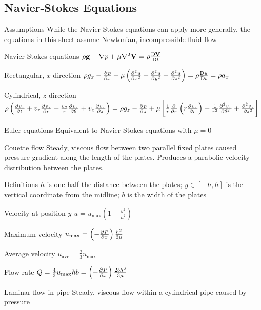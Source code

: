 \documentclass{article}
\begin{document}
\subsection{Navier-Stokes Equations}
\begin{description*}
\item[Assumptions] While the Navier-Stokes equations can apply more generally, the equations in this
  sheet assume Newtonian, incompressible fluid flow
\item[Navier-Stokes equations]
  \(\rho\vec{g} - \vec\nabla p + \mu\vec\nabla^2\vec{V} = \rho\frac{\Dif\vec V}{\Dif t}\)
  \begin{description*}
  \item[Rectangular, $x$ direction]
    \(\rho g_x - \pd{p}{x} + \mu\left(\pd[2]{u}{x}+\pd[2]{u}{y}+\pd[2]{u}{z}\right)
    = \rho\frac{\Dif u}{\Dif t} = \rho a_x\)
  \item[Cylindrical, $z$ direction]
    \(\rho\left(\pd{v_z}{t}+v_r\pd{v_z}{r}+\frac{v_\theta}{r}\pd{v_z}{\theta}+v_z\pd{v_z}{z}\right)
    = \rho g_z - \pd{p}{z}
    + \mu\left[\frac{1}{r}\pd{}{r}\left(r\pd{v_z}{r}\right)
      + \frac{1}{r^2}\pd[2]{v_z}{\theta}
      + \pd[2]{v_z}{z}\right]\)
  \end{description*}
\item[Euler equations] Equivalent to Navier-Stokes equations with $\mu=0$
\item[Couette flow] Steady, viscous flow between two parallel fixed plates caused pressure gradient
  along the length of the plates. Produces a parabolic velocity distribution between the plates.
  \begin{description*}
  \item[Definitions] $h$ is one half the distance between the plates;
    $y\in[-h,h]$ is the vertical coordinate from the midline;
    $b$ is the width of the plates
  \item[Velocity at position $y$]
    \(u = u_\mathrm{max}\left(1-\frac{y^2}{h^2}\right)\)
  \item[Maximum velocity]
    \(u_\mathrm{max} = \left(-\pd{P}{x}\right)\frac{h^2}{2\mu}\)
  \item[Average velocity]
    \(u_\mathrm{ave} = \frac{2}{3}u_\mathrm{max}\)
  \item[Flow rate]
    \(Q = \frac{4}{3}u_\mathrm{max}hb = \left(-\pd{P}{x}\right)\frac{2bh^3}{3\mu}\)
  \end{description*}
\item[Laminar flow in pipe] Steady, viscous flow within a cylindrical pipe caused by pressure

\end{description*}
\end{document}
